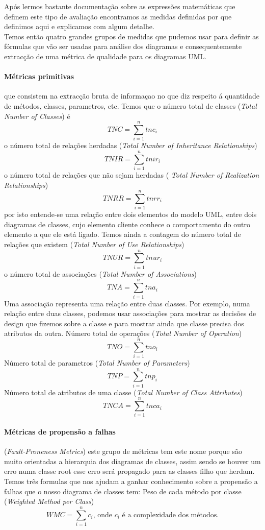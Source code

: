 Após lermos bastante documentação sobre as expressões matemáticas que definem este tipo de avaliação encontramos as medidas definidas por \cite{Peter}
que definimos aqui e explicamos com algum detalhe.\\

Temos então quatro grandes grupos de medidas que pudemos usar para definir as fórmulas que vão ser usadas para análise dos diagramas e
consequentemente extracção de uma métrica de qualidade para os diagramas UML.
\paragraph{Métricas primitivas} que consistem na extracção bruta de informaçao no que diz respeito á quantidade de métodos, classes, parametros, etc.
Temos que o número total de classes (\textit{Total Number of Classes}) é $$TNC = \sum_{i=1}^{n} tnc_i $$
o número total de relações herdadas (\textit{Total Number of Inheritance Relationships})  $$TNIR = \sum_{i=1}^{n} tnir_i $$
o número total de relações que não sejam herdadas (\textit{ Total Number of Realization Relationships})  $$TNRR = \sum_{i=1}^{n} tnrr_i $$ por isto entende-se
uma relação entre dois elementos do modelo UML, entre dois diagramas de classes, cujo elemento cliente conhece o comportamento do outro elemento a que ele está ligado.
Temos ainda a contagem do número total de relações que existem (\textit{Total Number of Use Relationships})  $$TNUR = \sum_{i=1}^{n} tnur_i $$
o número total de associações (\textit{Total Number of Associations})    $$TNA = \sum_{i=1}^{n} tna_i $$
Uma associação representa uma relação entre duas classes. Por exemplo, numa relação entre duas classes, podemos usar associações para mostrar as decisões de design
que fizemos sobre a classe e para mostrar ainda que classe precisa dos atributos da outra.
Número total de operações (\textit{Total Number of Operation})   $$TNO = \sum_{i=1}^{n} tno_i $$
Número total de parametros (\textit{Total Number of Parameters})  $$TNP = \sum_{i=1}^{n} tnp_i $$
Número total de atributos de uma classe (\textit{Total Number of Class Attributes})  $$TNCA = \sum_{i=1}^{n} tnca_i $$

\paragraph{Métricas de propensão a falhas} (\textit{Fault-Proneness Metrics}) este grupo de métricas tem este nome porque são muito orientadas a hierarquia dos diagramas
de classes, assim sendo se houver um erro numa classe root esse erro será propagado para as classes filho que herdam.
Temos três formulas que nos ajudam a ganhar conhecimento sobre a propensão a falhas que o nosso diagrama de classes tem:
Peso de cada método por classe (\textit{Weighted Method per Class}) 
\begin{displaymath}
WMC = \sum_{i=1}^{n} c_i  \textrm{, onde $c_i$ é a complexidade dos métodos.}
\end{displaymath}

